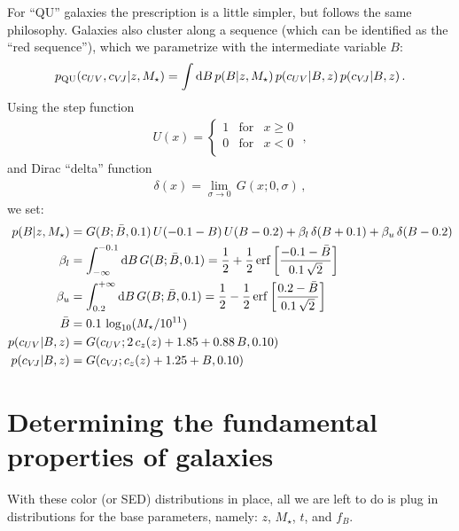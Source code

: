\documentclass[11pt,a4paper]{article}
\newcommand{\mstar}{M_\star}
\newcommand{\dd}{\mathrm{d}}
\numberwithin{equation}{section}
\begin{document}
For ``QU'' galaxies the prescription is a little simpler, but follows the same philosophy. Galaxies also cluster along a sequence (which can be identified as the ``red sequence''), which we parametrize with the intermediate variable $B$:
\begin{align}
p_{\rm QU}(c_{UV}, c_{V\!J} | z, \mstar) = \int \dd B\,p(B | z, \mstar)\,p(c_{UV} | B,z)\,p(c_{V\!J} | B,z)\,.
\end{align}
Using the step function
\begin{align}
U(x) = \left\{\begin{array}{lll}
1 & \text{for} & x \ge 0\, \\
0 & \text{for} & x < 0\, \\
\end{array}\right.\,,
\end{align}
and Dirac ``delta'' function
\begin{align}
\delta(x) = \lim_{\sigma \to 0}\,G(x; 0, \sigma)\,,
\end{align}
we set:
\begin{align}
p(B | z, \mstar) &= G(B; \bar{B}, 0.1)\,U(-0.1-B)\,U(B-0.2) + \beta_l\,\delta(B+0.1) + \beta_u\,\delta(B-0.2) \\
\beta_l &= \int_{-\infty}^{-0.1}\dd B\,G(B; \bar{B}, 0.1) = \frac{1}{2} + \frac{1}{2}\,{\rm erf}\left[\frac{-0.1-\bar{B}}{0.1\,\sqrt{2}}\right]\\
\beta_u &= \int_{0.2}^{+\infty}\dd B\,G(B; \bar{B}, 0.1) = \frac{1}{2} - \frac{1}{2}\,{\rm erf}\left[\frac{0.2-\bar{B}}{0.1\,\sqrt{2}}\right]\\
\bar{B} &= 0.1\,\log_{10}(\mstar/10^{11}) \\
p(c_{UV} | B,z) &= G(c_{UV}; 2\,c_z(z)+1.85+0.88\,B, 0.10) \\
p(c_{V\!J} | B,z) &= G(c_{V\!J}; c_z(z)+1.25+B, 0.10)
\end{align}

\section{Determining the fundamental properties of galaxies}

With these color (or SED) distributions in place, all we are left to do is plug in distributions for the base parameters, namely: $z$, $\mstar$, $t$, and $f_B$.
\end{document}
